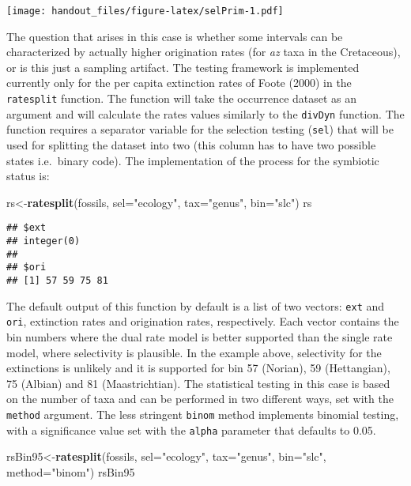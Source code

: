 \documentclass[]{article}
\newenvironment{Shaded}{\begin{snugshade}}{\end{snugshade}}
\newcommand{\DataTypeTok}[1]{\textcolor[rgb]{0.13,0.29,0.53}{#1}}
\newcommand{\KeywordTok}[1]{\textcolor[rgb]{0.13,0.29,0.53}{\textbf{#1}}}
\newcommand{\NormalTok}[1]{#1}
\newcommand{\StringTok}[1]{\textcolor[rgb]{0.31,0.60,0.02}{#1}}
\begin{document}
\texttt{[image: handout\_files/figure-latex/selPrim-1.pdf]}

The question that arises in this case is whether some intervals can be
characterized by actually higher origination rates (for \emph{az} taxa
in the Cretaceous), or is this just a sampling artifact. The testing
framework is implemented currently only for the per capita extinction
rates of Foote (2000) in the \texttt{ratesplit} function. The function
will take the occurrence dataset as an argument and will calculate the
rates values similarly to the \texttt{divDyn} function. The function
requires a separator variable for the selection testing (\texttt{sel})
that will be used for splitting the dataset into two (this column has to
have two possible states i.e.~binary code). The implementation of the
process for the symbiotic status is:

\begin{Shaded}
\begin{Highlighting}[]
\NormalTok{rs<-}\KeywordTok{ratesplit}\NormalTok{(fossils, }\DataTypeTok{sel=}\StringTok{"ecology"}\NormalTok{, }\DataTypeTok{tax=}\StringTok{"genus"}\NormalTok{, }\DataTypeTok{bin=}\StringTok{"slc"}\NormalTok{)}
\NormalTok{rs}
\end{Highlighting}
\end{Shaded}

\begin{verbatim}
## $ext
## integer(0)
## 
## $ori
## [1] 57 59 75 81
\end{verbatim}

The default output of this function by default is a list of two vectors:
\texttt{ext} and \texttt{ori}, extinction rates and origination rates,
respectively. Each vector contains the bin numbers where the dual rate
model is better supported than the single rate model, where selectivity
is plausible. In the example above, selectivity for the extinctions is
unlikely and it is supported for bin 57 (Norian), 59 (Hettangian), 75
(Albian) and 81 (Maastrichtian). The statistical testing in this case is
based on the number of taxa and can be performed in two different ways,
set with the \texttt{method} argument. The less stringent \texttt{binom}
method implements binomial testing, with a significance value set with
the \texttt{alpha} parameter that defaults to 0.05.

\begin{Shaded}
\begin{Highlighting}[]
\NormalTok{rsBin95<-}\KeywordTok{ratesplit}\NormalTok{(fossils, }\DataTypeTok{sel=}\StringTok{"ecology"}\NormalTok{, }\DataTypeTok{tax=}\StringTok{"genus"}\NormalTok{, }
  \DataTypeTok{bin=}\StringTok{"slc"}\NormalTok{, }\DataTypeTok{method=}\StringTok{"binom"}\NormalTok{)}
\NormalTok{rsBin95}
\end{Highlighting}
\end{Shaded}
\end{document}
